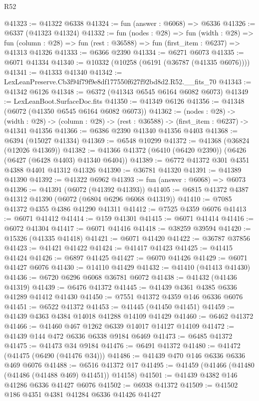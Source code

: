 \begin{lexlean}{R52}
\begin{coremodule}
@41323 := @41322 @6338
@41324 := fun (answer : @6068) => @6336
@41326 := @6337 (@41323 @41324)
@41332 := fun (nodes : @28) =>
  fun (width : @28) =>
  fun (column : @28) => fun (rest : @36588) => fun (first_item : @6237) => @41313 @41326
@41333 := @6366 @2390
@41334 := @6271 @6073
@41335 := @6071 @41334
@41340 := @10332 (@10258 (@6191 (@36787 (@41335 @6076))))
@41341 := @41333 @41340
@41342 := LexLeanPreserve.Cb3f94f79f9e8df177550f627f92bd8d2.R52.__fits_70
@41343 := @41342 @6126
@41348 := @6372 (@41343 @6545 @6164 @6082 @6073)
@41349 := LexLeanBoot.SurfaceDoc.fits
@41350 := @41349 @6126
@41356 := @41348 (@6072 (@41350 @6545 @6164 @6082 @6073))
@41362 := (nodes : @28) ->
  (width : @28) -> (column : @28) -> (rest : @36588) -> (first_item : @6237) -> @41341 @41356
@41366 := @6386 @2390 @41340 @41356 @4403
@41368 := @6394 (@15027 @41334)
@41369 := @6548 @10299
@41372 := @41368 (@36824 (@12026 @41369))
@41382 := @41366 @41372 (@6410 (@6420 @2390)) (@6426 (@6427 (@6428 @4403) @41340 @6404))
@41389 := @6772 @41372 @301 @4351 @4388 @4401 @41312 @41326
@41390 := @36781 @41320
@41391 := @41389 @41390
@41392 := @41322 @6962
@41393 := fun (answer : @6068) => @6073
@41396 := @41391 (@6072 (@41392 @41393))
@41405 := @6815 @41372 @4387 @41312 @41390 (@6072 (@6804 @6296 @6068 @41319))
@41410 := @7085 @41372 @4355 @4386 @41290 @41311
@41412 := @7525 @4359 @6076
@41413 := @6071 @41412
@41414 := @159 @41301
@41415 := @6071 @41414
@41416 := @6072 @41304
@41417 := @6071 @41416
@41418 := @38259 @39594
@41420 := @15326 (@41335 @41418)
@41421 := @6071 @41420
@41422 := @36787 @37856
@41423 := @41421 @41422
@41424 := @41417 @41423
@41425 := @41415 @41424
@41426 := @6897 @41425
@41427 := @6070 @41426
@41429 := @6071 @41427 @6076
@41430 := @14110 @41429
@41432 := @41410 (@41413 @41430)
@41436 := @6720 @6296 @6068 @36781 @6072
@41438 := @41432 (@41436 @41319)
@41439 := @6476 @41372
@41445 := @41439 @4361 @4385 @6336 @41289 @41412 @41430
@41450 := @7551 @41372 @4359 @146 @6336 @6076
@41451 := @6522 @41372
@41453 := @41445 (@41450 @41451)
@41459 := @41439 @4363 @4384 @14018 @41288 @14109 @41429
@41460 := @6462 @41372
@41466 := @41460 @467 @1262 @6339 @14017 @14127 @14109
@41472 := @41439 @144 @472 @6336 @6338 @9184 @6469
@41473 := @6485 @41372
@41475 := @41473 @34 @9184
@41476 := @6491 @41372
@41480 := @41472 (@41475 (@6490 (@41476 @34)))
@41486 := @41439 @470 @146 @6336 @6336 @469 @6076
@41488 := @6516 @41372 @17
@41495 := @41459 (@41466 (@41480 (@41486 (@41488 @469) @41451)) @14158)
@41501 := @41439 @4382 @146 @41286 @6336 @41427 @6076
@41502 := @6938 @41372
@41509 := @41502 @186 @4351 @4381 @41284 @6336 @41426 @41427

\end{coremodule}
\end{lexlean}
